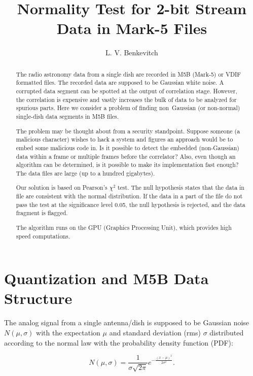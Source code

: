 \documentclass[letterpaper,twoside,12pt]{article}
\title{Normality Test for 2-bit Stream Data in Mark-5 Files}
\author[1]{L. V. Benkevitch}
\affil[1]{\small MIT Haystack observatory, Westford, MA 01886, USA.}
\begin{document}
\maketitle

\begin{abstract}
The radio astronomy data from a single dish are recorded in M5B (Mark-5) or VDIF formatted files. The recorded data are supposed to be Gaussian white noise. A corrupted data segment can be spotted at the output of correlation stage. However, the correlation is expensive and vastly increases the bulk of data to be analyzed for spurious parts. Here we consider a problem of finding non~Gaussian (or non-normal) single-dish data segments in M5B files.

The problem may be thought about from a security standpoint. Suppose someone (a malicious character) wishes to hack a system and figures an approach would be to embed some malicious code in. Is it possible to detect the embedded (non-Gaussian) data within a frame or multiple frames before the correlator? Also, even though an algorithm can be determined, is it possible to make its implementation fast enough? The data files are large (up to a hundred gigabytes).

Our solution is based on Pearson's $\chi^2$ test. The null hypothesis states that the data in file  are consistent with the normal distribution. If the data in a part of the file do not pass the test at the significance level 0.05, the null hypothesis is rejected, and the data fragment is flagged.

The algorithm runs on the GPU (Graphics Processing Unit), which provides high speed computations.
\end{abstract}


\tableofcontents

\section{Quantization and M5B Data Structure}

The analog signal from a single antenna/dish is supposed to be Gaussian noise $N(\mu,\sigma)$ with the expectation $\mu$ and standard deviation (rms) $\sigma$ distributed according to the normal law with the probability density function (PDF):

\begin{equation}
  \label{normal_pdf}
  N(\mu,\sigma) =  \frac{1}{\sigma\sqrt{2\pi}} e^{-\frac{(x-\mu)^2}{2\sigma^2}}.
\end{equation}
\end{document}
